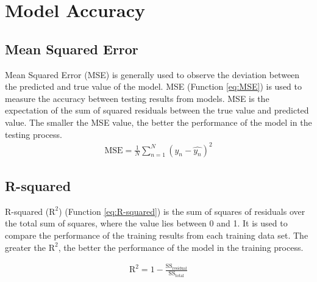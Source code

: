 \section{Model Accuracy} %

\subsection{Mean Squared Error}
Mean Squared Error (MSE) is generally used to observe the deviation between the predicted and true value of the model. MSE (Function \ref{eq:MSE}) is used to measure the accuracy between testing results from models. MSE is the expectation of the sum of squared residuals between the true value and predicted value. The smaller the MSE value, the better the performance of the model in the testing process.
\begin{eqnarray}
    {\text{MSE} ={\frac {1}{N}}\sum _{n=1}^{N}(y_{n}-{\hat {y_{n}}})^{2}}
    \label{eq:MSE}
\end{eqnarray}


\subsection{R-squared}
R-squared ($\text{R}^{2}$) (Function \ref{eq:R-squared}) is the sum of squares of residuals over the total sum of squares, where the value lies between 0 and 1. It is used to compare the performance of the training results from each training data set. The greater the $\text{R}^{2}$, the better the performance of the model in the training process.

\begin{eqnarray}
    \text{R}^{2} = {1}-{\frac {\text{SS}_{\text{residual}}}{\text{SS}_{\text{total}}}}
    \label{eq:R-squared}
\end{eqnarray}